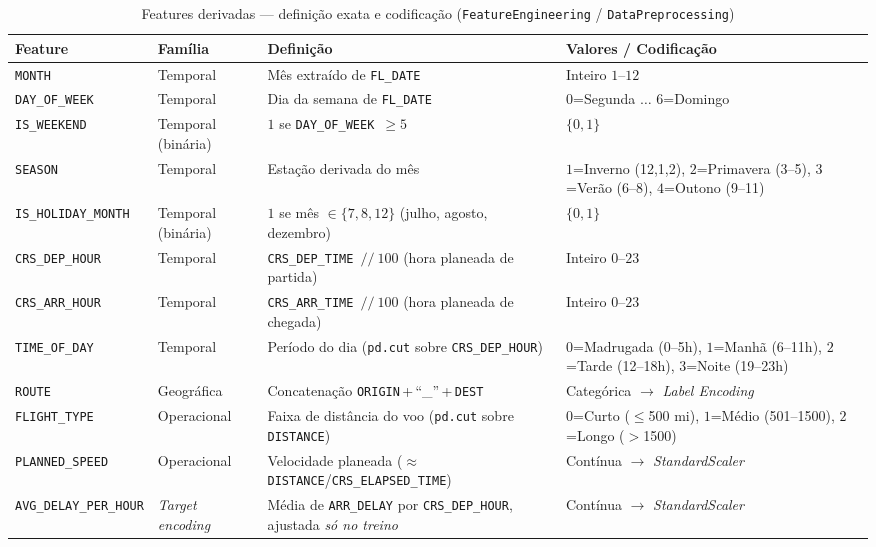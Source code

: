 \documentclass[conference]{IEEEtran}
\begin{document}
\begin{table}[t]
\centering
\caption{Features derivadas — definição exata e codificação (\texttt{FeatureEngineering} / \texttt{DataPreprocessing})}
\label{tab:features}
\begin{tabular}{p{2.6cm}p{2.0cm}p{6.0cm}p{4.5cm}}
\toprule
\textbf{Feature} & \textbf{Família} & \textbf{Definição} & \textbf{Valores / Codificação} \\
\midrule
\texttt{MONTH}            & Temporal & Mês extraído de \texttt{FL\_DATE} & Inteiro $1$–$12$ \\
\texttt{DAY\_OF\_WEEK}    & Temporal & Dia da semana de \texttt{FL\_DATE} & $0$=Segunda $\dots$ $6$=Domingo \\
\texttt{IS\_WEEKEND}      & Temporal (binária) & $1$ se \texttt{DAY\_OF\_WEEK}~$\geq 5$ & $\{0,1\}$ \\
\texttt{SEASON}           & Temporal & Estação derivada do mês & $1$=Inverno (12,1,2), $2$=Primavera (3–5), $3$=Verão (6–8), $4$=Outono (9–11) \\
\texttt{IS\_HOLIDAY\_MONTH} & Temporal (binária) & $1$ se mês $\in \{7,8,12\}$ (julho, agosto, dezembro) & $\{0,1\}$ \\
\texttt{CRS\_DEP\_HOUR}   & Temporal & \texttt{CRS\_DEP\_TIME}~$//~100$ (hora planeada de partida) & Inteiro $0$–$23$ \\
\texttt{CRS\_ARR\_HOUR}   & Temporal & \texttt{CRS\_ARR\_TIME}~$//~100$ (hora planeada de chegada) & Inteiro $0$–$23$ \\
\texttt{TIME\_OF\_DAY}    & Temporal & Período do dia (\texttt{pd.cut} sobre \texttt{CRS\_DEP\_HOUR}) & $0$=Madrugada (0–5h), $1$=Manhã (6–11h), $2$=Tarde (12–18h), $3$=Noite (19–23h) \\
\texttt{ROUTE}            & Geográfica & Concatenação \texttt{ORIGIN}\,+\,``\_''\,+\,\texttt{DEST} & Categórica $\rightarrow$ \textit{Label Encoding} \\
\texttt{FLIGHT\_TYPE}     & Operacional & Faixa de distância do voo (\texttt{pd.cut} sobre \texttt{DISTANCE}) & $0$=Curto ($\leq$500 mi), $1$=Médio (501–1500), $2$=Longo ($>$1500) \\
\texttt{PLANNED\_SPEED}   & Operacional & Velocidade planeada ($\approx$\texttt{DISTANCE}/\texttt{CRS\_ELAPSED\_TIME}) & Contínua $\rightarrow$ \textit{StandardScaler} \\
\texttt{AVG\_DELAY\_PER\_HOUR} & \textit{Target encoding} & Média de \texttt{ARR\_DELAY} por \texttt{CRS\_DEP\_HOUR}, ajustada \emph{só no treino} & Contínua $\rightarrow$ \textit{StandardScaler} \\
\bottomrule
\end{tabular}
\end{table}
\end{document}
